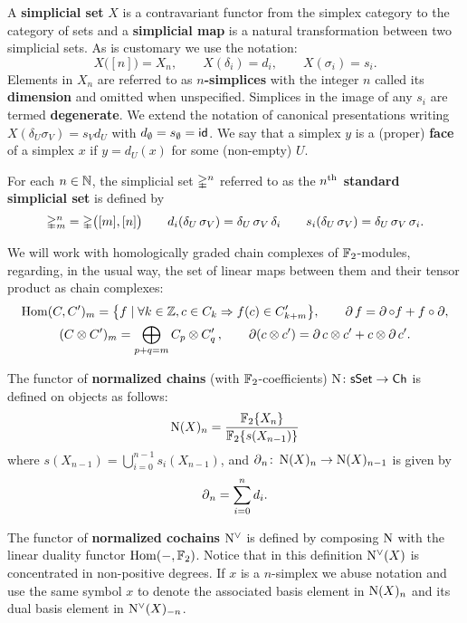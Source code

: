 A \textbf{simplicial set} $X$ is a contravariant functor from the simplex category to the category of sets and a \textbf{simplicial map} is a natural transformation between two simplicial sets.
As is customary we use the notation:
\[
X \big( [n] \big) = X_n, \qquad
X(\delta_i) = d_i, \qquad
X(\sigma_i) = s_i.
\]
Elements in $X_n$ are referred to as \mbox{\textbf{$n$-simplices}} with the integer $n$ called its \textbf{dimension} and omitted when unspecified.
Simplices in the image of any $s_i$ are termed \textbf{degenerate}.
We extend the notation of canonical presentations writing $X(\delta_U \sigma_V) = s_V d_U$ with $d_\emptyset = s_\emptyset = \mathsf{id}$.
We say that a simplex $y$ is a (proper) \textbf{face} of a simplex $x$ if $y = d_U(x)$ for some (non-empty) $U$.


For each $n \in \mathbb{N}$, the simplicial set $\mathbb{\Delta}^n$ referred to as the \textbf{$n^{\mathrm{th}}$ standard simplicial set} is defined by
\[
\mathbb{\Delta}^n_m = \mathbb{\Delta} \big( [m], [n] \big) \qquad
d_i(\delta_U\, \sigma_V) = \delta_U\, \sigma_V \, \delta_i \qquad
s_i(\delta_U\, \sigma_V) = \delta_U\, \sigma_V \, \sigma_i.
\]

We will work with homologically graded chain complexes of ${\mathbb{F}_2}$-modules, regarding, in the usual way, the set of linear maps between them and their tensor product as chain complexes:
\begin{gather*}
\mathrm{Hom}(C, C^\prime)_m = \big\{f \mid \forall k \in \mathbb{Z}, c \in C_k \Rightarrow f(c) \in C^\prime_{k+m} \big\},
\qquad
\operatorname{\partial} f = \operatorname{\partial} \circ f + f \circ \operatorname{\partial}, \\
(C \otimes C^\prime)_m = \bigoplus_{p + q = m} C_p \otimes C^\prime_q \,,
\qquad
\operatorname{\partial} (c \otimes c^\prime) = \operatorname{\partial} c \otimes c^\prime + c \otimes \operatorname{\partial} c^\prime.
\end{gather*}

The functor of \textbf{normalized chains} (with ${\mathbb{F}_2}$-coefficients) $\operatorname{N} \colon \mathsf{sSet} \to \mathsf{Ch}$ is defined on objects as follows:
\[
\operatorname{N}(X)_n = \frac{{\mathbb{F}_2} \{ X_n \}}{{\mathbb{F}_2} \{ s(X_{n-1}) \}}
\]
where $s(X_{n-1}) = \bigcup_{i=0}^{n-1} s_i(X_{n-1})$, and $\operatorname{\partial}_n \colon \operatorname{N}(X)_n \to \operatorname{N}(X)_{n-1}$ is given by
\[
\operatorname{\partial}_n = \sum_{i = 0}^{n} d_{i}.
\]

The functor of \textbf{normalized cochains} $\operatorname{N^{\vee}}$ is defined by composing $\operatorname{N}$ with the linear duality functor $\mathrm{Hom}(-, {\mathbb{F}_2})$.
Notice that in this definition $\operatorname{N^{\vee}}(X)$ is concentrated in non-positive degrees.
If $x$ is a $n$-simplex we abuse notation and use the same symbol $x$ to denote the associated basis element in $\operatorname{N}(X)_n$ and its dual basis element in $\operatorname{N^{\vee}}(X)_{-n}$.